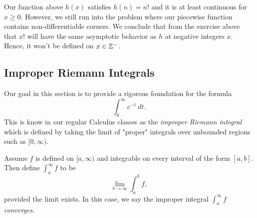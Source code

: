 Our function above \( h(x)  \) satisfies \( h(n) = n!   \) and it is at least continuous for \( x \geq 0  \). However, we still run into the problem where our piecewise function contains non-differentiable corners. We conclude that from the exercise above that \( x!  \) will have the same asymptotic behavior as \( h  \) at negative integers \( x  \). Hence, it won't be defined on \( x \in \mathbb{Z}^{-} \).

\subsection{Improper Riemann Integrals} 

Our goal in this section is to provide a rigorous foundation for the formula
\[  \int_{ 0 }^{ \infty  }  e^{-t} \ dt. \] 
This is know in our regular Calculus classes as the \textit{improper Riemann integral} which is defined by taking the limit of "proper" integrals over unbounded regions such as \( [0,\infty ) \). 

\begin{definition}
    Assume \( f  \) is defined on \( [a,\infty ) \) and integrable on every interval of the form \( [a,b]  \). Then define \( \int_{ a }^{ \infty  }  f  \) to be  
    \[  \lim_{ b \to \infty  }  \int_{ a }^{ b } f,  \] provided the limit exists. In this case, we say the improper integral \( \int_{ a }^{ \infty  }  f  \) \textit{converges}. 
\end{definition}

